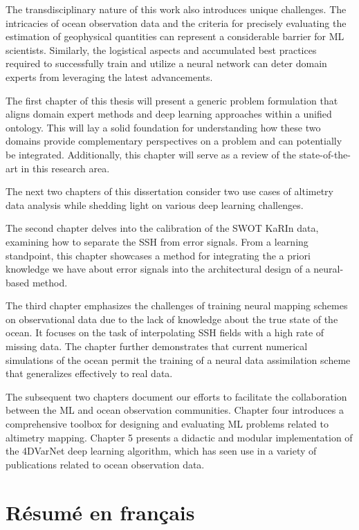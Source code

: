 \begin{bibunit}
The transdisciplinary nature of this work also introduces unique challenges. The intricacies of ocean observation data and the criteria for precisely evaluating the estimation of geophysical quantities can represent a considerable barrier for ML scientists. Similarly, the logistical aspects and accumulated best practices required to successfully train and utilize a neural network can deter domain experts from leveraging the latest advancements.

The first chapter of this thesis will present a generic problem formulation that aligns domain expert methods and deep learning approaches within a unified ontology. This will lay a solid foundation for understanding how these two domains provide complementary perspectives on a problem and can potentially be integrated. Additionally, this chapter will serve as a review of the state-of-the-art in this research area.

The next two chapters of this dissertation consider two use cases of altimetry data analysis while shedding light on various deep learning challenges.

The second chapter delves into the calibration of the SWOT KaRIn data, examining how to separate the SSH from error signals. From a learning standpoint, this chapter showcases a method for integrating the a priori knowledge we have about error signals into the architectural design of a neural-based method.

The third chapter emphasizes the challenges of training neural mapping schemes on observational data due to the lack of knowledge about the true state of the ocean. It focuses on the task of interpolating SSH fields with a high rate of missing data. The chapter further demonstrates that current numerical simulations of the ocean permit the training of a neural data assimilation scheme that generalizes effectively to real data.

The subsequent two chapters document our efforts to facilitate the collaboration between the ML and ocean observation communities. Chapter four introduces a comprehensive toolbox for designing and evaluating ML problems related to altimetry mapping. Chapter 5 presents a didactic and modular implementation of the 4DVarNet deep learning algorithm, which has seen use in a variety of publications related to ocean observation data.


\chapter*{Résumé en français}


\end{bibunit}
